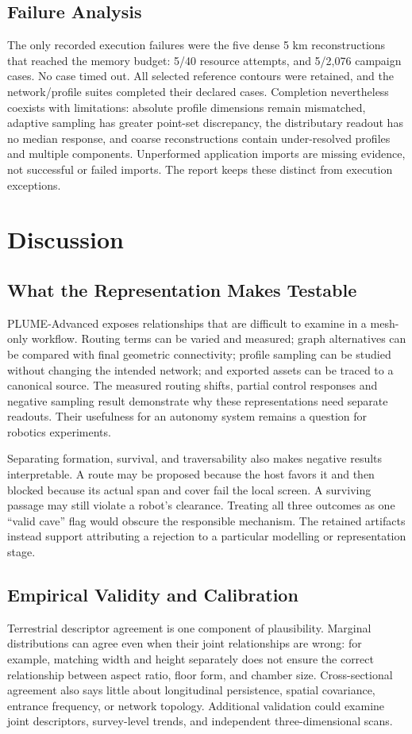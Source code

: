\documentclass[conference]{IEEEtran}
\begin{document}
\subsection{Failure Analysis}
The only recorded execution failures were the five dense 5 km reconstructions that reached the memory budget: 5/40 resource attempts, and 5/2,076 campaign cases. No case timed out. All selected reference contours were retained, and the network/profile suites completed their declared cases. Completion nevertheless coexists with limitations: absolute profile dimensions remain mismatched, adaptive sampling has greater point-set discrepancy, the distributary readout has no median response, and coarse reconstructions contain under-resolved profiles and multiple components. Unperformed application imports are missing evidence, not successful or failed imports. The report keeps these distinct from execution exceptions.

\section{Discussion}
\subsection{What the Representation Makes Testable}
PLUME-Advanced exposes relationships that are difficult to examine in a mesh-only workflow. Routing terms can be varied and measured; graph alternatives can be compared with final geometric connectivity; profile sampling can be studied without changing the intended network; and exported assets can be traced to a canonical source. The measured routing shifts, partial control responses and negative sampling result demonstrate why these representations need separate readouts. Their usefulness for an autonomy system remains a question for robotics experiments.

Separating formation, survival, and traversability also makes negative results interpretable. A route may be proposed because the host favors it and then blocked because its actual span and cover fail the local screen. A surviving passage may still violate a robot's clearance. Treating all three outcomes as one ``valid cave'' flag would obscure the responsible mechanism. The retained artifacts instead support attributing a rejection to a particular modelling or representation stage.

\subsection{Empirical Validity and Calibration}
Terrestrial descriptor agreement is one component of plausibility. Marginal distributions can agree even when their joint relationships are wrong: for example, matching width and height separately does not ensure the correct relationship between aspect ratio, floor form, and chamber size. Cross-sectional agreement also says little about longitudinal persistence, spatial covariance, entrance frequency, or network topology. Additional validation could examine joint descriptors, survey-level trends, and independent three-dimensional scans.
\end{document}
